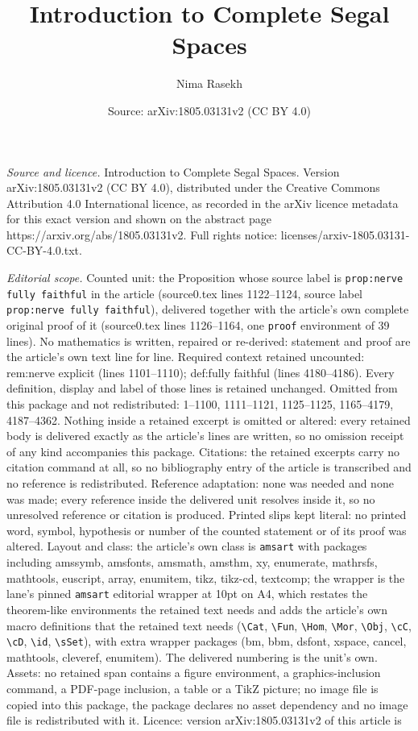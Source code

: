 \documentclass[10pt,a4paper]{amsart}
\title[Introduction to Complete Segal Spaces]{Introduction to Complete Segal Spaces}
\author{Nima Rasekh}
\date{Source: arXiv:1805.03131v2 (CC BY 4.0)}
\begin{document}
\maketitle

\noindent\emph{Source and licence.} Introduction to Complete Segal Spaces. Version arXiv:1805.03131v2 (CC BY 4.0), distributed under the Creative Commons Attribution 4.0 International licence, as recorded in the arXiv licence metadata for this exact version and shown on the abstract page https://arxiv.org/abs/1805.03131v2. Full rights notice: licenses/arxiv-1805.03131-CC-BY-4.0.txt.\par\smallskip

\noindent\textit{Editorial scope.} Counted unit: the Proposition whose source label is \texttt{prop:nerve fully faithful} in the article (source0.tex lines 1122--1124, source label \texttt{prop:nerve fully faithful}), delivered together with the article's own complete original proof of it (source0.tex lines 1126--1164, one \texttt{proof} environment of 39 lines). No mathematics is written, repaired or re-derived: statement and proof are the article's own text line for line. Required context retained uncounted: rem:nerve explicit (lines 1101--1110); def:fully faithful (lines 4180--4186). Every definition, display and label of those lines is retained unchanged. Omitted from this package and not redistributed: 1--1100, 1111--1121, 1125--1125, 1165--4179, 4187--4362. Nothing inside a retained excerpt is omitted or altered: every retained body is delivered exactly as the article's lines are written, so no omission receipt of any kind accompanies this package. Citations: the retained excerpts carry no citation command at all, so no bibliography entry of the article is transcribed and no reference is redistributed. Reference adaptation: none was needed and none was made; every reference inside the delivered unit resolves inside it, so no unresolved reference or citation is produced. Printed slips kept literal: no printed word, symbol, hypothesis or number of the counted statement or of its proof was altered. Layout and class: the article's own class is \texttt{amsart} with packages including amssymb, amsfonts, amsmath, amsthm, xy, enumerate, mathrsfs, mathtools, euscript, array, enumitem, tikz, tikz-cd, textcomp; the wrapper is the lane's pinned \texttt{amsart} editorial wrapper at 10pt on A4, which restates the theorem-like environments the retained text needs and adds the article's own macro definitions that the retained text needs (\texttt{\textbackslash Cat}, \texttt{\textbackslash Fun}, \texttt{\textbackslash Hom}, \texttt{\textbackslash Mor}, \texttt{\textbackslash Obj}, \texttt{\textbackslash cC}, \texttt{\textbackslash cD}, \texttt{\textbackslash id}, \texttt{\textbackslash sSet}), with extra wrapper packages (bm, bbm, dsfont, xspace, cancel, mathtools, cleveref, enumitem). The delivered numbering is the unit's own. Assets: no retained span contains a figure environment, a graphics-inclusion command, a PDF-page inclusion, a table or a TikZ picture; no image file is copied into this package, the package declares no asset dependency and no image file is redistributed with it. Licence: version arXiv:1805.03131v2 of this article is 
\end{document}
